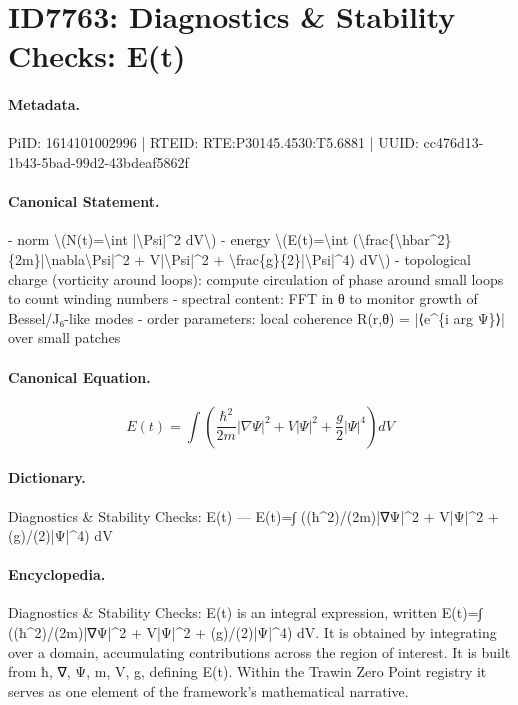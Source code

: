 \section*{ID7763: Diagnostics \& Stability Checks: E(t)}
\paragraph{Metadata.}
PiID: 1614101002996 | RTEID: RTE:P30145.4530:T5.6881 | UUID: cc476d13-1b43-5bad-99d2-43bdeaf5862f

\paragraph{Canonical Statement.}
- norm \textbackslash{}(N(t)=\textbackslash{}int |\textbackslash{}Psi|\textasciicircum{}2 dV\textbackslash{}) - energy \textbackslash{}(E(t)=\textbackslash{}int (\textbackslash{}frac\{\textbackslash{}hbar\textasciicircum{}2\}\{2m\}|\textbackslash{}nabla\textbackslash{}Psi|\textasciicircum{}2 + V|\textbackslash{}Psi|\textasciicircum{}2 + \textbackslash{}frac\{g\}\{2\}|\textbackslash{}Psi|\textasciicircum{}4) dV\textbackslash{}) - topological charge (vorticity around loops): compute circulation of phase around small loops to count winding numbers - spectral content: FFT in θ to monitor growth of Bessel/J₆-like modes - order parameters: local coherence R(r,θ) = |⟨e\textasciicircum{}\{i arg Ψ\}⟩| over small patches

\paragraph{Canonical Equation.}
\[
E(t)=\int (\frac{\hbar^2}{2m}|\nabla\Psi|^2 + V|\Psi|^2 + \frac{g}{2}|\Psi|^4) dV
\]

\paragraph{Dictionary.}
Diagnostics \& Stability Checks: E(t) — E(t)=∫ ((ħ\textasciicircum{}2)/(2m)|∇Ψ|\textasciicircum{}2 + V|Ψ|\textasciicircum{}2 + (g)/(2)|Ψ|\textasciicircum{}4) dV

\paragraph{Encyclopedia.}
Diagnostics \& Stability Checks: E(t) is an integral expression, written E(t)=∫ ((ħ\textasciicircum{}2)/(2m)|∇Ψ|\textasciicircum{}2 + V|Ψ|\textasciicircum{}2 + (g)/(2)|Ψ|\textasciicircum{}4) dV. It is obtained by integrating over a domain, accumulating contributions across the region of interest. It is built from ħ, ∇, Ψ, m, V, g, defining E(t). Within the Trawin Zero Point registry it serves as one element of the framework's mathematical narrative.
